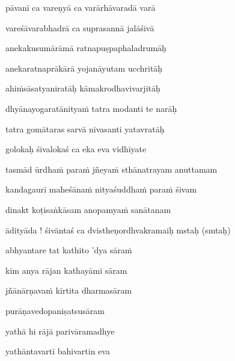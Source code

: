 pāvanī ca vareṇyā ca varārhāvaradā varā\thinspace{\dandab} \dontdisplaylinenum

vareśāvarabhadrā ca suprasannā jalāśivā \veg\dontdisplaylinenum

anekakusumārāmā ratnapuṣpaphaladrumāḥ\thinspace{\dandab} \dontdisplaylinenum

anekaratnaprākārā yojanāyutam ucchritāḥ \veg\dontdisplaylinenum

ahi\.msāsatyaniratāḥ kāmakrodhavivarjitāḥ\thinspace{\dandab} \dontdisplaylinenum

dhyānayogaratānitya\.m tatra modanti te narāḥ \veg\dontdisplaylinenum 

tatra gomātaras sarvā nivasanti yatavratāḥ\thinspace{\dandab} \dontdisplaylinenum

golokaḥ śivalokaś ca eka eva vidhīyate \veg\dontdisplaylinenum

tasmād ūrdha\.m para\.m jñeya\.m sthānatrayam anuttamam\thinspace{\dandab} \dontdisplaylinenum

kandagaurī maheśāna\.m nityaśuddha\.m para\.m śivam \veg\dontdisplaylinenum

dinakt koṭisaṅkāsam anopamya\.m sanātanam\thinspace{\dandab} \dontdisplaylinenum

ādityāda ! śivāntaś ca dvistheṇordhvakramaiḥ mstaḥ (smtaḥ) \veg\dontdisplaylinenum


\ujvers\nemsloka 
abhyantare tat kathito 'dya sāra\.m
\dontdisplaylinenum

\nemslokab 
kim anya rājan kathayāmi sāram \danda\dontdisplaylinenum

\nemslokac 
jñānārṇava\.m kīrtita dharmasāram
\dontdisplaylinenum

\nemslokad 
purāṇavedopaniṣatsusāram \veg\dontdisplaylinenum

\ujvers\nemsloka 
yathā hi rājā parivāramadhye
\dontdisplaylinenum

\nemslokab 
yathāntavartī bahivartin eva \danda\dontdisplaylinenum

